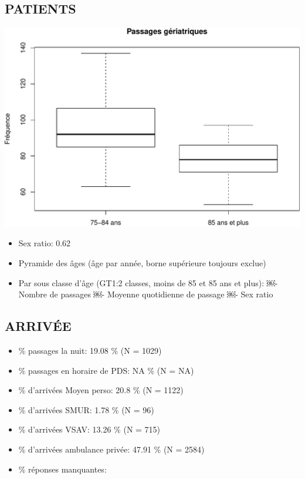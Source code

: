 \documentclass[]{article}
\begin{document}
\subsection{PATIENTS}\label{patients}

\includegraphics{rapport_2014_files/figure-latex/sexe75-1.pdf}

\begin{itemize}
\itemsep1pt\parskip0pt
\item
  Sex ratio: 0.62
\item
  Pyramide des âges (âge par année, borne supérieure toujours exclue)
\item
  Par sous classe d'âge (GT1:2 classes, moins de 85 et 85 ans et plus):
  ￼- Nombre de passages ￼- Moyenne quotidienne de passage ￼- Sex ratio
\end{itemize}

\subsection{ARRIVÉE}\label{arrivee}

\begin{itemize}
\itemsep1pt\parskip0pt
\item
  \% passages la nuit: 19.08 \% (N = 1029)
\item
  \% passages en horaire de PDS: NA \% (N = NA)
\item
  \% d'arrivées Moyen perso: 20.8 \% (N = 1122)
\item
  \% d'arrivées SMUR: 1.78 \% (N = 96)
\item
  \% d'arrivées VSAV: 13.26 \% (N = 715)
\item
  \% d'arrivées ambulance privée: 47.91 \% (N = 2584)
\item
  \% réponses manquantes:
\end{itemize}
\end{document}
